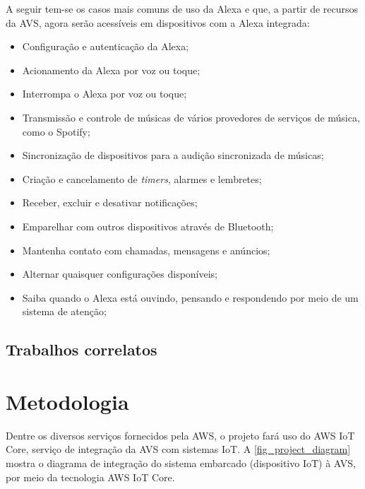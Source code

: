 \documentclass[
    12pt,
    openright,
    twoside,
    a4paper,
    english,
    spanish,
    brazil,
    ]{abntex2}
\begin{document}
A seguir tem-se os casos mais comuns de uso da Alexa e que, a partir de recursos da AVS, agora serão acessíveis em dispositivos com a Alexa integrada:
\begin{itemize}
	\item Configuração e autenticação da Alexa;
	\item Acionamento da Alexa por voz ou toque;
	\item Interrompa o Alexa por voz ou toque;
	\item Transmissão e controle de músicas de vários provedores de serviços de música, como o Spotify;
	\item Sincronização de dispositivos para a audição sincronizada de músicas;
	\item Criação e cancelamento de \textit{timers}, alarmes e lembretes;
	\item Receber, excluir e desativar notificações;
	\item Emparelhar com outros dispositivos através de Bluetooth;
	\item Mantenha contato com chamadas, mensagens e anúncios;
	\item Alternar quaisquer configurações disponíveis;
	\item Saiba quando o Alexa está ouvindo, pensando e respondendo por meio de um sistema de atenção;
\end{itemize}

\section{Trabalhos correlatos}

\chapter{Metodologia}

Dentre os diversos serviços fornecidos pela AWS, o projeto fará uso do AWS IoT Core, serviço de integração da AVS com sistemas IoT. A \autoref{fig_project_diagram} mostra o diagrama de integração do sistema embarcado (dispositivo IoT) à AVS, por meio da tecnologia AWS IoT Core.
\end{document}
